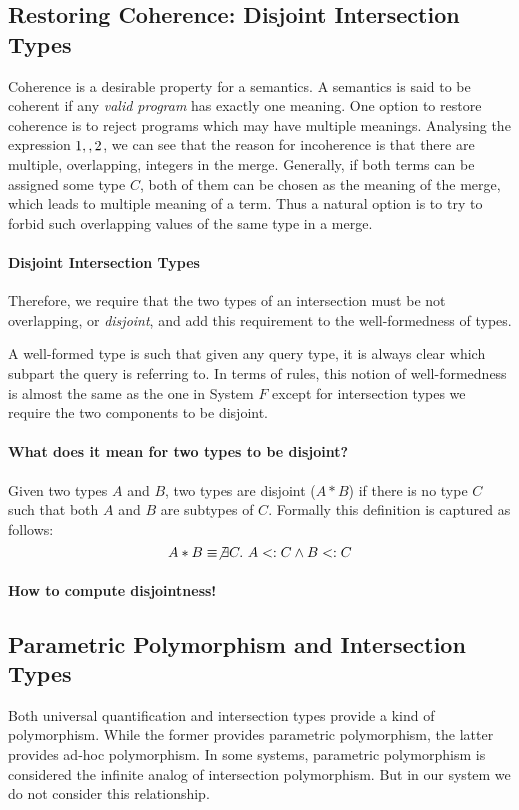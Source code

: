 \subsection{Restoring Coherence: Disjoint Intersection Types}
Coherence is a desirable property for a semantics. A semantics is said
to be coherent if any \emph{valid program} has exactly one meaning.
One option to restore coherence is to reject programs which may have
multiple meanings. 
Analysing the expression $1 ,, 2$, we can see that the reason 
for incoherence is that there are multiple, overlapping, integers in the
merge. Generally, if both terms can be assigned some type $C$,
both of them can be chosen as the meaning of the merge,
which leads to multiple meaning of a term.
Thus a natural option is to try to forbid such overlapping 
values of the same type in a merge. 

\paragraph{Disjoint Intersection Types}
Therefore, we require that the two types of an intersection must be not
overlapping, or \emph{disjoint}, and add this requirement to the well-formedness of types.

A well-formed type is such that given any query type,
it is always clear which subpart the query is referring to.
In terms of rules, this notion of well-formedness is almost the same as the one in System $F$
except for intersection types we require the two components to be disjoint.

\paragraph{What does it mean for two types to be disjoint?}

 Given two types $A$ and $B$, two types are disjoint
($A * B$) if there is no type $C$ such that both $A$ and $B$ are
subtypes of $C$. Formally this definition is captured as follows:
\[A * B \equiv \not\exists C.~A <: C \wedge B <: C\]

\paragraph{How to compute disjointness!}

\subsection{Parametric Polymorphism and Intersection Types}
Both universal quantification and intersection types provide a kind of
polymorphism. While the former provides parametric polymorphism, the latter
provides ad-hoc polymorphism. In some systems, parametric polymorphism is
considered the infinite analog of intersection polymorphism. But in our system
we do not consider this relationship.  


